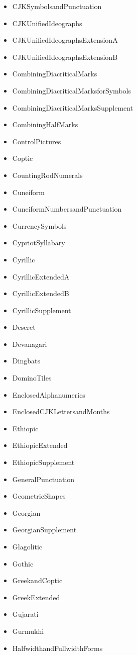 ﻿\documentclass{article}
\newenvironment{itemlist}{%
  \begin{itemize}
	\setlength{\itemsep}{0pt}
	\setlength{\parsep}{0pt}
	\setlength{\topsep}{0pt}
	\setlength{\partopsep}{0pt}
	\setlength{\parskip}{0pt}
	\setlength{\labelsep}{5pt}}%
{
  \end{itemize}}
\begin{document}
\begin{multicols}{2}
\begin{itemlist}
				\item CJKSymbolsandPunctuation
				\item CJKUnifiedIdeographs
				\item CJKUnifiedIdeographsExtensionA
				\item CJKUnifiedIdeographsExtensionB
				\item CombiningDiacriticalMarks
				\item CombiningDiacriticalMarksforSymbols
				\item CombiningDiacriticalMarksSupplement
				\item CombiningHalfMarks
				\item ControlPictures
				\item Coptic
				\item CountingRodNumerals
				\item Cuneiform
				\item CuneiformNumbersandPunctuation
				\item CurrencySymbols
				\item CypriotSyllabary
				\item Cyrillic
				\item CyrillicExtendedA
				\item CyrillicExtendedB
				\item CyrillicSupplement
				\item Deseret
				\item Devanagari
				\item Dingbats
				\item DominoTiles
				\item EnclosedAlphanumerics
				\item EnclosedCJKLettersandMonths
				\item Ethiopic
				\item EthiopicExtended
				\item EthiopicSupplement
				\item GeneralPunctuation
				\item GeometricShapes
				\item Georgian
				\item GeorgianSupplement
				\item Glagolitic
				\item Gothic
				\item GreekandCoptic
				\item GreekExtended
				\item Gujarati
				\item Gurmukhi
				\item HalfwidthandFullwidthForms

\end{itemlist}
\end{multicols}
\end{document}
